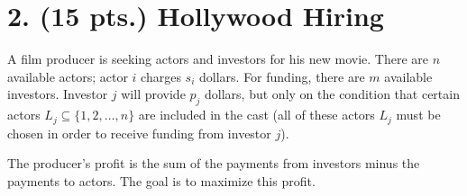 \documentclass[11pt]{article}
\begin{document}
\newpage

\pagestyle{plain}

\section*{2.  (15 pts.) Hollywood Hiring}

A film producer is seeking actors and investors for his new movie. 
There are $n$ available actors; actor $i$ charges $s_i$ dollars. 
For funding, there are $m$ available investors. Investor $j$ will provide 
$p_j$ dollars, but only on the condition that certain actors 
$L_j\subseteq \{1,2,\ldots,n\}$
are included in the cast (all of these actors $L_j$ must be chosen in order 
to receive funding from investor $j$).

The producer's profit is the sum of the payments from investors minus 
the payments to actors. The goal is to maximize this profit.
\end{document}
